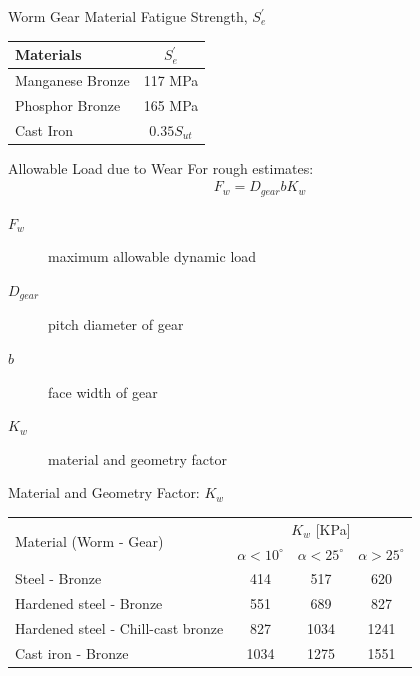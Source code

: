 \documentclass[
10pt,
a4paper,
openany,
svgnames,
]{book}
\begin{document}
\begin{frame}{Worm Gear Material Fatigue Strength, $S_{e}^{\prime}$}
  \begin{table}[htbp]
    \centering
    \begin{tabular}{lc}
      \toprule
      Materials & $S_{e}^{\prime}$ \\
      \midrule
      Manganese Bronze & 117 MPa \\
      Phosphor Bronze & 165 MPa \\
      Cast Iron & $0.35S_{ut}$ \\
      \bottomrule
    \end{tabular}
  \end{table}
\end{frame}

\begin{frame}{Allowable Load due to Wear}
  For rough estimates:
  \begin{align*}
    F_{w} = D_{gear} b K_{w}
  \end{align*}
  \begin{description}
    \item[$F_{w}$] maximum allowable dynamic load
    \item[$D_{gear}$] pitch diameter of gear
    \item[$b$] face width of gear
    \item[$K_{w}$] material and geometry factor
  \end{description}
\end{frame}

\begin{frame}{Material and Geometry Factor: $K_{w}$}
  \begin{table}[htbp]
    \centering
    \begin{tabular}{lccc}
      \toprule
      \multirow{2}{*}{Material (Worm - Gear)} & \multicolumn{3}{c}{$K_{w}$ [KPa]} \\
      \cmidrule{2-4}
      & $\alpha < 10^{\circ}$ & $\alpha < 25^{\circ}$ & $\alpha > 25^{\circ}$ \\
      \midrule
      Steel - Bronze & 414 & 517 & 620 \\
      Hardened steel - Bronze & 551 & 689 & 827 \\
      Hardened steel - Chill-cast bronze & 827 & 1034 & 1241 \\
      Cast iron - Bronze & 1034 & 1275 & 1551 \\
      \bottomrule
    \end{tabular}
  \end{table}
\end{frame}
\end{document}
